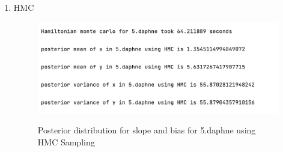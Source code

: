 \documentclass{article}
\begin{document}
\begin{enumerate}
\begin{enumerate}
\newpage
\item HMC

\begin{figure}[!ht]
	\centering
	\includegraphics[scale=0.5]{../figs/HMC/5_program_results}
\end{figure}

\begin{figure}[!htp] 
    \centering
    \hfill%
        \caption{Posterior distribution for slope and bias for 5.daphne using HMC Sampling}
\end{figure}


\end{enumerate}
\end{enumerate}
\end{document}
